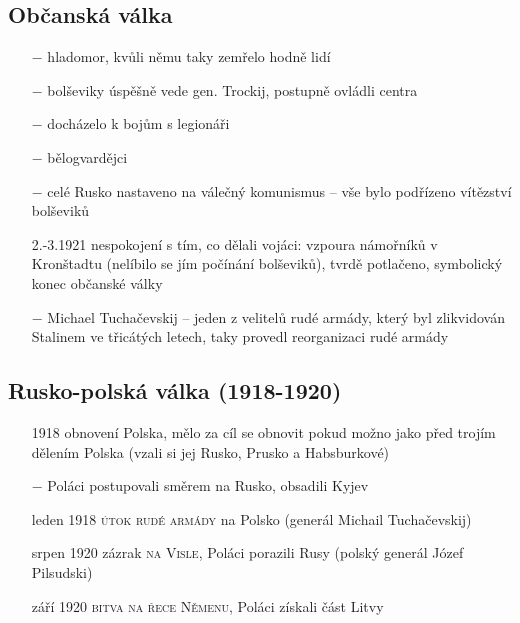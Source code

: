 \documentclass{article}
\begin{document}
\subsection*{Občanská válka}
\begin{itemize}
    \vspace{-0.5em}
    \setlength\itemsep{0.15em}
    \item[$-$] hladomor, kvůli němu taky zemřelo hodně lidí
    \item[$-$] bolševiky úspěšně vede gen. Trockij, postupně ovládli centra
    \item[$-$] docházelo k bojům s legionáři
    \item[$-$] bělogvardějci
    \item[$-$] celé Rusko nastaveno na válečný komunismus -- vše bylo podřízeno vítězství bolševiků
    \item[2.-3.1921] nespokojení s tím, co dělali vojáci: vzpoura námořníků v Kronštadtu (nelíbilo se jím počínání bolševiků), tvrdě potlačeno, symbolický konec občanské války
    \item[$-$] Michael Tuchačevskij -- jeden z velitelů rudé armády, který byl zlikvidován Stalinem ve třicátých letech, taky provedl reorganizaci rudé armády
\end{itemize}

\subsection*{Rusko-polská válka (1918-1920)}
\begin{itemize}
    \vspace{-0.5em}
    \setlength\itemsep{0.15em}
    \item[1918] obnovení Polska, mělo za cíl se obnovit pokud možno jako před trojím dělením Polska (vzali si jej Rusko, Prusko a Habsburkové)
    \item[$-$] Poláci postupovali směrem na Rusko, obsadili Kyjev
    \item[leden 1918] \textsc{útok rudé armády} na Polsko (generál Michail Tuchačevskij)
    \item[srpen 1920] zázrak \textsc{na Visle}, Poláci porazili Rusy (polský generál Józef Pilsudski)
    \item[září 1920] \textsc{bitva na řece Němenu}, Poláci získali část Litvy
\end{itemize}
\end{document}
